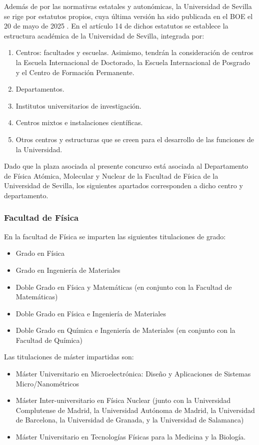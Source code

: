 \documentclass[a4paper,12pt,twoside]{article}
\begin{document}
Además de por las normativas estatales y autonómicas, la Universidad de Sevilla se rige por estatutos propios, cuya última versión ha sido publicada en el BOE el 20 de mayo de 2025 \cite{estatutos}. En el artículo 14 de dichos estatutos se establece la estructura académica de la Universidad de Sevilla, integrada por:

\begin{enumerate}[label=\alph*)]
\item Centros: facultades y escuelas. Asimismo, tendrán la consideración de centros la Escuela Internacional de Doctorado, la Escuela Internacional de Posgrado y el Centro de Formación Permanente.
\item Departamentos.
\item Institutos universitarios de investigación.
\item Centros mixtos e instalaciones científicas.
\item Otros centros y estructuras que se creen para el desarrollo de las funciones de la Universidad.
\end{enumerate}

Dado que la plaza asociada al presente concurso está asociada al Departamento de Física Atómica, Molecular y Nuclear de la Facultad de Física de la Universidad de Sevilla, los siguientes apartados corresponden a dicho centro y departamento.

\subsubsection{Facultad de Física}

En la facultad de Física se imparten las siguientes titulaciones de grado:
\begin{itemize}
\item Grado en Física
\item Grado en Ingeniería de Materiales
\item Doble Grado en Física y Matemáticas (en conjunto con la Facultad de Matemáticas)
\item Doble Grado en Física e Ingeniería de Materiales
\item Doble Grado en Química e Ingeniería de Materiales (en conjunto con la Facultad de Química)
\end{itemize} 

Las titulaciones de máster impartidas son:
\begin{itemize}
\item Máster Universitario en Microelectrónica: Diseño y Aplicaciones de Sistemas Micro/Nanométricos
\item Máster Inter-universitario en Física Nuclear (junto con la Universidad Complutense de Madrid, la Universidad Autónoma de Madrid, la Universidad de Barcelona, la Universidad de Granada, y la Universidad de Salamanca) 
\item Máster Universitario en Tecnologías Físicas para la Medicina y la Biología.
\end{itemize} 
\end{document}

